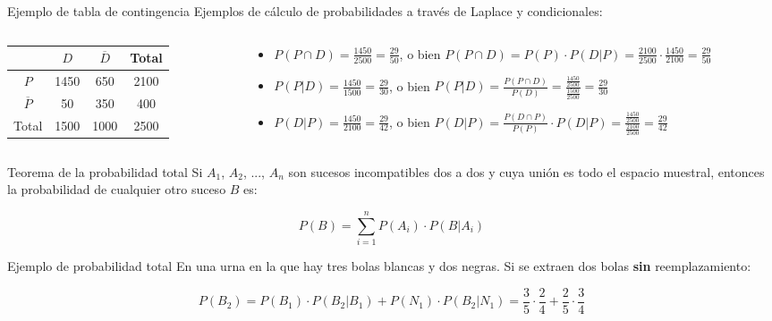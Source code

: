 \documentclass[11pt,handout]{beamer}
\begin{document}
\begin{frame}{Ejemplo de tabla de contingencia}
Ejemplos de cálculo de probabilidades a través de Laplace y condicionales:
\begin{columns}
\begin{column}{0.41\textwidth}
     \begin{tabular}{|c | c | c | c |} 
     \hline
      &  $D$ & $\overline{D}$ & Total \\ [0.5ex] 
     \hline
     $P$ & \color{red}1450 & \color{red}650 & 2100 \\ 
     \hline
     $\overline{P}$ & \color{red}50  & 350 & \color{red}400 \\
     \hline
     Total & 1500 & \color{red}1000 &  2500 \\
     \hline
    \end{tabular}
\end{column}
\begin{column}{0.65\textwidth}  
\begin{itemize}[<+->]
    \item $P(P \cap D)= \frac{1450}{2500}=\frac{29}{50}$, o bien $P(P \cap D)= P(P)\cdot P(D|P)=\frac{2100}{2500}\cdot \frac{1450}{2100}=\frac{29}{50}$
    \item $P(P|D)=\frac{1450}{1500}=\frac{29}{30}$, o bien $P(P|D)=\frac{P(P \cap D)}{P(D)} =\frac{\frac{1450}{2500}}{\frac{1500}{2500}}=\frac{29}{30}$
    \item $P(D|P)=\frac{1450}{2100}=\frac{29}{42}$, o bien $P(D|P)= \frac{P(D \cap P)}{P(P)} \cdot P(D|P)=\frac{\frac{1450}{2500}}{\frac{2100}{2500}}=\frac{29}{42}$
\end{itemize}
\end{column}
\end{columns}
\end{frame}

\begin{frame}{Teorema de la probabilidad total}
Si $A_1$, $A_2$, ..., $A_n$   son sucesos incompatibles dos a dos y cuya unión es todo el espacio muestral, entonces la probabilidad de cualquier otro suceso $B$ es:
\begin{block}{}
$$P(B)=\sum_{i=1}^n P(A_i)\cdot  P(B|A_i) $$
\end{block}

\end{frame}

\begin{frame}{Ejemplo de probabilidad total}
En una urna en la que hay tres bolas blancas y dos negras. Si se extraen dos bolas \textbf{sin} reemplazamiento:

\pause
$$P(B_2)=P(B_1)\cdot P(B_2|B_1) + P(N_1)\cdot P(B_2|N_1)
= \frac{3}{5}\cdot\frac{2}{4} + \frac{2}{5}\cdot\frac{3}{4}$$
\end{frame}
\end{document}
